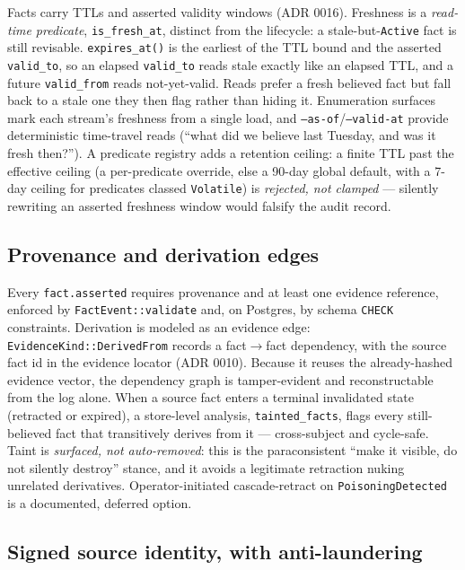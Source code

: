 \documentclass[11pt]{article}
\newcommand{\code}[1]{\texttt{#1}}
\begin{document}
Facts carry TTLs and asserted validity windows (ADR 0016). Freshness is a \emph{read-time predicate}, \code{is\_fresh\_at}, distinct from the lifecycle: a stale-but-\code{Active} fact is still revisable. \code{expires\_at()} is the earliest of the TTL bound and the asserted \code{valid\_to}, so an elapsed \code{valid\_to} reads stale exactly like an elapsed TTL, and a future \code{valid\_from} reads not-yet-valid. Reads prefer a fresh believed fact but fall back to a stale one they then flag rather than hiding it. Enumeration surfaces mark each stream's freshness from a single load, and \code{--as-of}/\code{--valid-at} provide deterministic time-travel reads (``what did we believe last Tuesday, and was it fresh then?''). A predicate registry adds a retention ceiling: a finite TTL past the effective ceiling (a per-predicate override, else a 90-day global default, with a 7-day ceiling for predicates classed \code{Volatile}) is \emph{rejected, not clamped} --- silently rewriting an asserted freshness window would falsify the audit record.

\subsection{Provenance and derivation edges}

Every \code{fact.asserted} requires provenance and at least one evidence reference, enforced by \code{FactEvent::validate} and, on Postgres, by schema \code{CHECK} constraints. Derivation is modeled as an evidence edge: \code{EvidenceKind::DerivedFrom} records a fact$\rightarrow$fact dependency, with the source fact id in the evidence locator (ADR 0010). Because it reuses the already-hashed evidence vector, the dependency graph is tamper-evident and reconstructable from the log alone. When a source fact enters a terminal invalidated state (retracted or expired), a store-level analysis, \code{tainted\_facts}, flags every still-believed fact that transitively derives from it --- cross-subject and cycle-safe. Taint is \emph{surfaced, not auto-removed}: this is the paraconsistent ``make it visible, do not silently destroy'' stance, and it avoids a legitimate retraction nuking unrelated derivatives. Operator-initiated cascade-retract on \code{PoisoningDetected} is a documented, deferred option.

\subsection{Signed source identity, with anti-laundering}
\end{document}
